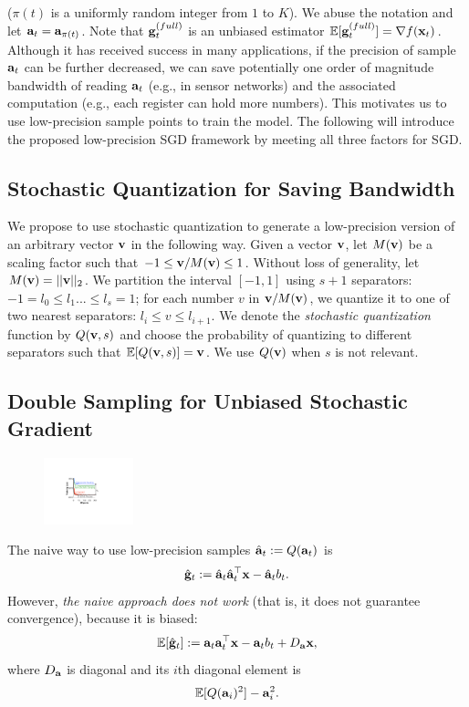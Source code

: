 \documentclass{article}
\def\a{{\bf a}}
\def\g{{\bf g}}
\def\x{{\bf x}}
\def\v{{\bf v}}
\def\E{\mathbb{E}}
\begin{document}
($\pi(t)$ is a uniformly random integer from $1$ to $K$). We abuse the notation and let $\a_t = \a_{\pi(t)}$. Note that $\g_t^{(full)}$ is an unbiased estimator $\E [\g_t^{(full)}] = \nabla f(\x_t)$. Although it has received success in many applications, 
if the precision of sample $\a_{t}$ can be further decreased,
we can save potentially one order of magnitude bandwidth
of reading $\a_{t}$ (e.g., in sensor networks) and the associated computation (e.g.,
each register can hold more numbers). 
This motivates us to use low-precision sample points to train the model. The following will introduce the proposed low-precision SGD framework by meeting all three factors for SGD.

\subsection{Stochastic Quantization for Saving Bandwidth} 

We propose to use stochastic quantization to generate a low-precision version of an arbitrary vector $\v$ in the following 
way. Given a vector
$\v$, let $M(\v)$ be a scaling factor such that $-1 \le \v/M(\v) \le 1$. Without loss of generality, let $M(\v)=||\v||_2$. We partition the interval $[-1, 1]$ using $s+1$ separators: $-1 = l_0 \le l_1 ... \le l_{s} = 1$; for each number $v$ in $\v/M(\v)$, we 
quantize it to one of two nearest separators: $l_i \le v \le l_{i+1}$. We denote the \emph{stochastic quantization} function by $Q(\v, s)$ and choose the probability of quantizing to different separators such that $\E[Q(\v, s)] = \v$. We use $Q(\v)$ when $s$ is not relevant.

\subsection{Double Sampling for Unbiased Stochastic Gradient}

\begin{figure}
  \begin{center}
    \includegraphics[width=0.23\textwidth]{micro-experiments/gap.pdf}
  \end{center}
  \label{fig:gap}
\end{figure}
The naive way to use low-precision samples $\hat{\a}_t := Q(\a_t)$ is 
\[
\hat{\g}_t := \hat{\a}_t \hat{\a}_t^\top \x - \hat{\a}_t b_t.
\]
However, \emph{the naive approach does not work} (that is, it does not guarantee convergence), because it is biased: 
\[
\E[\hat{\g}_t] := \a_t \a_t^\top \x - \a_t b_t + D_{\a} \x, 
\]
where $D_{\a}$ is diagonal and its $i$th diagonal element is 
\[
\E[ Q(\a_i)^2 ] - \a_i^2.
\]
\end{document}
